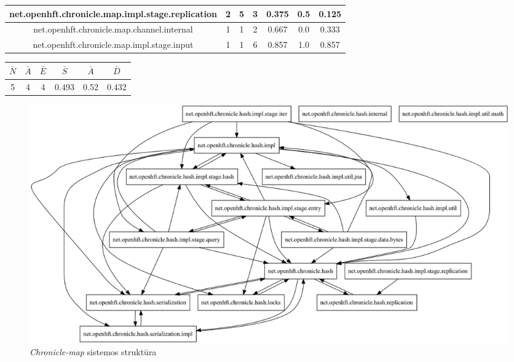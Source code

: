 \begin{center}
\begin{tabular}{|c|c|c|c|c|c|c|}
        net.openhft.chronicle.map.impl.stage.replication & 2 & 5 & 3 & 0.375 & 0.5 & 0.125 \\
        \hline
        net.openhft.chronicle.map.channel.internal & 1 & 1 & 2 & 0.667 & 0.0 & 0.333 \\
        \hline
        net.openhft.chronicle.map.impl.stage.input & 1 & 1 & 6 & 0.857 & 1.0 & 0.857 \\
        \hline
    \end{tabular}
    \begin{tabular}{|c|c|c|c|c|c|}
        \hline
        $\bar{N}$ & $\bar{A}$ & $\bar{E}$ & $\bar{S}$ & $\bar{A}$ & $\bar{D}$ \\ [0.5ex]
        \hline\hline
        5 & 4 & 4 & 0.493 & 0.52 & 0.432 \\
        \hline
    \end{tabular}
\end{center}


\begin{figure}[H]
    \centering
    \includegraphics[scale=0.5]{img/open_hft_packages_orig}
    \caption{\textit{Chronicle-map} sistemos struktūra}
    \label{img:open_hft_packages_orig}
\end{figure}

